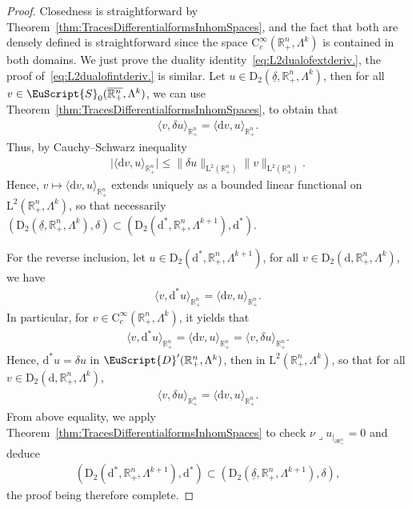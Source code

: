 \documentclass[10pt]{amsart}
\theoremstyle{definition}\newtheorem{defi}[theo]{Definition}\newtheorem{rema}[theo]{Remark}\newtheorem{exam}[theo]{Example}\newtheorem{exem}[theo]{Example}\newtheorem{nota}[theo]{Notation}
\newcommand{\bbR}{\mathbb{R}}
\newcommand{\rmd}{\mathrm{d}}
\newcommand{\rmD}{\mathrm{D}}
\newcommand{\rmL}{\mathrm{L}}
\newcommand{\rmC}{\mathrm{C}}
\newcommand{\eus}{\EuScript}
\newcommand{\iprod}{\mathbin{\lrcorner}}
\begin{document}
\begin{proof}
Closedness is straightforward by Theorem~\ref{thm:TracesDifferentialformsInhomSpaces}, and the fact that both are densely defined is straightforward since the space $\rmC _c^\infty(\bbR^n_+,\Lambda^k)$ is contained in both domains. We just prove the duality identity~\eqref{eq:L2dualofextderiv.}, the proof of~\eqref{eq:L2dualofintderiv.} is similar. Let $u\in \rmD_2(\underline{\delta},\bbR^n_+,\Lambda^{k})$, then for all $v\in\eus{S}_0(\overline{\bbR^n_+},\Lambda^k)$, we can use Theorem~\ref{thm:TracesDifferentialformsInhomSpaces}, to obtain that
\begin{align*}
\big\langle v, \delta u \big\rangle_{\bbR^n_+} = \big\langle \rmd v, u \big\rangle_{\bbR^n_+} .
\end{align*}
Thus, by Cauchy--Schwarz inequality
\begin{align*}
\big|\big\langle \rmd v, u \big\rangle_{\bbR^n_+}\big| \leqslant \| \delta u\|_{\rmL^2\left(\bbR^n_+\right)} \| v\|_{\rmL^2\left(\bbR^n_+\right)}.
\end{align*}
Hence, $v\mapsto \langle \rmd v, u \rangle_{\bbR^n_+}$ extends uniquely as a bounded linear functional on $\rmL^2(\bbR^n_+,\Lambda^{k})$, so that necessarily $(\rmD_2(\underline{\delta},\bbR^n_+,\Lambda^{k}),\delta)\subset (\rmD_2(\rmd^\ast,\bbR^n_+,\Lambda^{k+1}),\rmd^\ast)$.

For the reverse inclusion, let $u\in \rmD_2(\rmd^\ast,\bbR^n_+,\Lambda^{k+1})$, for all $v\in \rmD_2(\rmd,\bbR^n_+,\Lambda^{k})$, we have
\begin{align*}
\big\langle v, \rmd^{\ast} u \big\rangle_{\bbR^n_+} = \big\langle \rmd v, u \big\rangle_{\bbR^n_+} .
\end{align*}
In particular, for $v\in\rmC_c^\infty(\bbR^n_+,\Lambda^k)$, it yields that
\begin{align*}
\big\langle v, \rmd^{\ast} u \big\rangle_{\bbR^n_+} = \big\langle \rmd v, u \big\rangle_{\bbR^n_+} = \big\langle v, \delta u \big\rangle_{\bbR^n_+} .
\end{align*}
Hence, $\rmd^{\ast} u = \delta u$ in $\eus{D}'(\bbR^n_+,\Lambda^{k})$, then in $\rmL^2(\bbR^n_+,\Lambda^{k})$, so that for all $v\in \rmD_2(\rmd,\bbR^n_+,\Lambda^{k})$,
\begin{align*}
\big\langle v, \delta u \big\rangle_{\bbR^n_+} = \big\langle \rmd v, u \big\rangle_{\bbR^n_+} .
\end{align*}
From above equality, we apply Theorem~\ref{thm:TracesDifferentialformsInhomSpaces} to check $\nu\iprod u_{|_{\partial\bbR^n_+}}=0$ and deduce
\begin{align*}
\left(\rmD_2\left(\rmd^\ast,\bbR^n_+,\Lambda^{k+1}\right),\rmd^\ast\right)\subset\left(\rmD_2\left(\underline{\delta},\bbR^n_+,\Lambda^{k+1}\right),\delta\right),
\end{align*}
the proof being therefore complete.
\end{proof}
\end{document}
